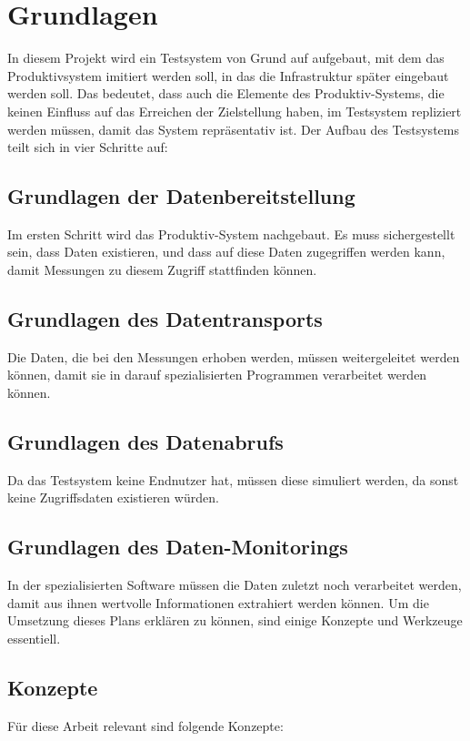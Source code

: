 \section{Grundlagen}
In diesem Projekt wird ein Testsystem von Grund auf aufgebaut, mit dem das Produktivsystem imitiert werden soll, in das die Infrastruktur später eingebaut werden soll. Das bedeutet, dass auch die Elemente des Produktiv-Systems, die keinen Einfluss auf das Erreichen der Zielstellung haben, im Testsystem repliziert werden müssen, damit das System repräsentativ ist. \newline
Der Aufbau des Testsystems teilt sich in vier Schritte auf:
\subsection{Grundlagen der Datenbereitstellung}
Im ersten Schritt wird das Produktiv-System nachgebaut. Es muss sichergestellt sein, dass Daten existieren, und dass auf diese Daten zugegriffen werden kann, damit Messungen zu diesem Zugriff stattfinden können.
\subsection{Grundlagen des Datentransports}
Die Daten, die bei den Messungen erhoben werden, müssen weitergeleitet werden können, damit sie in darauf spezialisierten Programmen verarbeitet werden können.
\subsection{Grundlagen des Datenabrufs}
Da das Testsystem keine Endnutzer hat, müssen diese simuliert werden, da sonst keine Zugriffsdaten existieren würden.
\subsection{Grundlagen des Daten-Monitorings}
In der spezialisierten Software müssen die Daten zuletzt noch verarbeitet werden, damit aus ihnen wertvolle Informationen extrahiert werden können.\newline
Um die Umsetzung dieses Plans erklären zu können, sind einige Konzepte und Werkzeuge essentiell.
\subsection {Konzepte} 
Für diese Arbeit relevant sind folgende Konzepte:

